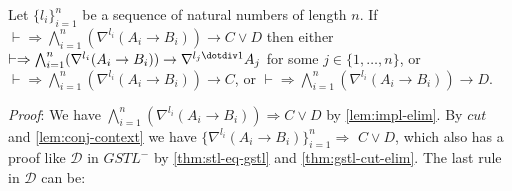 \begin{thm}\label{thm:visser}
  Let $\{ l_i \}_{i=1}^n$ be a sequence of natural numbers of length $n$. If $\vdash \Rightarrow \bigwedge_{i=1}^n (\nabla^{l_i} (A_i \rightarrow B_i)) \rightarrow C \lor D$ then either $\vdash \Rightarrow \bigwedge_{i=1}^n (\nabla^{l_i} (A_i \rightarrow B_i)) \rightarrow \nabla^{l_j \dotdiv 1} A_j$ for some $j \in \{ 1 , \dots , n \}$, or $\vdash \Rightarrow \bigwedge_{i=1}^n (\nabla^{l_i} (A_i \rightarrow B_i)) \rightarrow C$, or $\vdash \Rightarrow \bigwedge_{i=1}^n (\nabla^{l_i} (A_i \rightarrow B_i)) \rightarrow D$.
\end{thm}

\textit{Proof}:
We have $\bigwedge_{i=1}^n (\nabla^{l_i} (A_i \rightarrow B_i)) \Rightarrow C \lor D$ by \ref{lem:impl-elim}. By $cut$ and \ref{lem:conj-context} we have $\{ \nabla^{l_i} (A_i \rightarrow B_i) \}_{i=1}^n \Rightarrow$ $C \lor D$, which also has a proof like $\mathcal{D}$ in $GSTL^-$ by \ref{thm:stl-eq-gstl} and \ref{thm:gstl-cut-elim}. The last rule in $\mathcal{D}$ can be:
